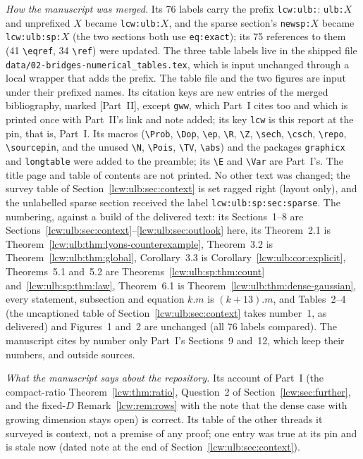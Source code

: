\documentclass[11pt,letterpaper]{article}
\theoremstyle{remark}\newtheorem{remark}[theorem]{Remark}
\newcommand{\E}{\mathbb E}\newcommand{\Pp}{\mathbb P}
\newcommand{\Var}{\operatorname{Var}}\newcommand{\Cov}{\operatorname{Cov}}
\newcommand{\file}[1]{\nolinkurl{#1}}
\DeclareMathOperator{\Pois}{Pois}
\DeclareMathOperator{\sech}{sech}
\DeclareMathOperator{\csch}{csch}
\DeclareMathOperator{\TV}{TV}
\newcommand{\Prob}{\mathbb P}
\newcommand{\N}{\mathbb N}
\newcommand{\R}{\mathbb R}
\newcommand{\Z}{\mathbb Z}
\newcommand{\Dop}{\mathcal D}
\newcommand{\ep}{\epsilon}
\newcommand{\abs}[1]{\left|#1\right|}
\newcommand{\repo}{\texttt{ProveIt}}
\newcommand{\sourcepin}{\texttt{136e707021c9}}
\begin{document}
\emph{How the manuscript was merged.} Its 76 labels carry the prefix
\file{lcw:ulb:}: \file{ulb:}$X$ and unprefixed $X$ became
\file{lcw:ulb:}$X$, and the sparse section's \file{newsp:}$X$ became
\file{lcw:ulb:sp:}$X$ (the two sections both use \file{eq:exact}); its 75
references to them (41 \verb|\eqref|, 34 \verb|\ref|) were updated. The
three table labels live in the shipped file
\file{data/02-bridges-numerical\_tables.tex}, which is input unchanged
through a local wrapper that adds the prefix. The table file and the two
figures are input under their prefixed names. Its citation keys are new
entries of the merged bibliography, marked [Part~II], except \file{gww},
which Part~I cites too and which is printed once with Part~II's link and note
added; its key \file{lcw} is this report at the pin, that is, Part~I. Its
macros (\verb|\Prob|, \verb|\Dop|, \verb|\ep|, \verb|\R|, \verb|\Z|,
\verb|\sech|, \verb|\csch|, \verb|\repo|, \verb|\sourcepin|, and the unused
\verb|\N|, \verb|\Pois|, \verb|\TV|, \verb|\abs|) and the
packages \texttt{graphicx} and \texttt{longtable} were added to the preamble;
its \verb|\E| and \verb|\Var| are Part~I's. The title page and table of
contents are not printed. No other text was changed; the survey table of
Section~\ref{lcw:ulb:sec:context} is set ragged right (layout only), and the
unlabelled sparse section received the label \file{lcw:ulb:sp:sec:sparse}.
The numbering, against
a build of the delivered text: its Sections~1--8 are
Sections~\ref{lcw:ulb:sec:context}--\ref{lcw:ulb:sec:outlook} here, its
Theorem~2.1 is Theorem~\ref{lcw:ulb:thm:lyons-counterexample}, Theorem~3.2
is Theorem~\ref{lcw:ulb:thm:global}, Corollary~3.3 is
Corollary~\ref{lcw:ulb:cor:explicit}, Theorems~5.1 and~5.2 are
Theorems~\ref{lcw:ulb:sp:thm:count} and~\ref{lcw:ulb:sp:thm:law},
Theorem~6.1 is Theorem~\ref{lcw:ulb:thm:dense-gaussian}, every statement,
subsection and equation $k.m$ is $(k{+}13).m$, and Tables~2--4 (the
uncaptioned table of Section~\ref{lcw:ulb:sec:context} takes number~1, as
delivered) and Figures~1 and~2 are unchanged (all 76 labels compared). The
manuscript cites by number only Part~I's Sections~9 and~12, which keep their
numbers, and outside sources.

\emph{What the manuscript says about the repository.} Its account of
Part~I (the compact-ratio Theorem~\ref{lcw:thm:ratio}, Question~2 of
Section~\ref{lcw:sec:further}, and the fixed-$D$ Remark~\ref{lcw:rem:rows}
with the note that the dense case with growing dimension stays open) is
correct. Its table of the other threads it surveyed is context, not a premise
of any proof; one entry was true at its pin and is stale now (dated note at
the end of Section~\ref{lcw:ulb:sec:context}).
\end{document}
